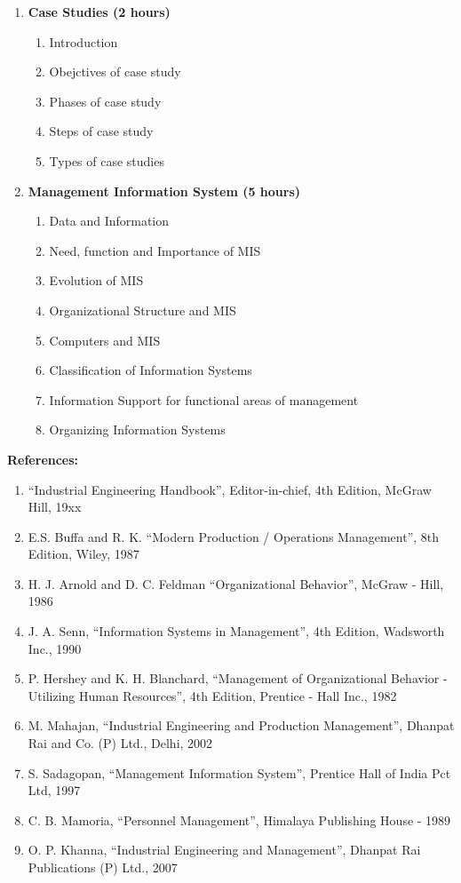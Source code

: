 \begin{enumerate}
\begin{enumerate}
    \end{enumerate}

  \item \textbf{Case Studies \hfill (2 hours)}
    \begin{enumerate}
      \item Introduction
      \item Obejctives of case study
      \item Phases of case study
      \item Steps of case study
      \item Types of case studies
    \end{enumerate}
  
  \item \textbf{Management Information System \hfill (5 hours)}
    \begin{enumerate}
      \item Data and Information
      \item Need, function and Importance of MIS
      \item Evolution of MIS
      \item Organizational Structure and MIS
      \item Computers and MIS
      \item Classification of Information Systems
      \item Information Support for functional areas of management
      \item Organizing Information Systems
    \end{enumerate}
\end{enumerate}
\Vs

\noindent \textbf{References:}
  \begin{enumerate}[label=\arabic*.]
    \item ``Industrial Engineering Handbook'', Editor-in-chief, 4th Edition, McGraw Hill, 19xx
    \item E.S. Buffa and R. K. ``Modern Production / Operations Management'', 8th Edition, Wiley, 1987
    \item H. J. Arnold and D. C. Feldman ``Organizational Behavior'', McGraw - Hill, 1986
    \item J. A. Senn, ``Information Systems in Management'', 4th Edition, Wadsworth Inc., 1990
    \item P. Hershey and K. H. Blanchard, ``Management of Organizational Behavior - Utilizing Human Resources'', 4th Edition, Prentice - Hall Inc., 1982
    \item M. Mahajan, ``Industrial Engineering and Production Management'', Dhanpat Rai and Co. (P) Ltd., Delhi, 2002
    \item S. Sadagopan, ``Management Information System'', Prentice Hall of India Pct Ltd, 1997
    \item C. B. Mamoria, ``Personnel Management'', Himalaya Publishing House - 1989
    \item O. P. Khanna, ``Industrial Engineering and Management'', Dhanpat Rai Publications (P) Ltd., 2007
  \end{enumerate}

\newpage